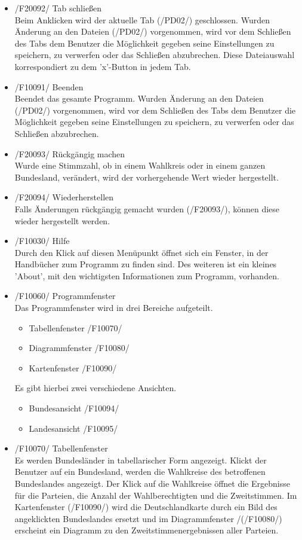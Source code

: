 \documentclass[10pt,a4paper]{article}
\begin{document}
\begin{itemize}
	\item /F20092/ Tab schließen \hfill \\
	Beim Anklicken wird der aktuelle Tab (/PD02/) geschlossen. Wurden Änderung an den Dateien (/PD02/) vorgenommen, wird vor dem Schließen des Tabs dem Benutzer die Möglichkeit gegeben seine Einstellungen zu speichern, zu verwerfen oder das Schließen abzubrechen. Diese Dateiauswahl korrespondiert zu dem 'x'-Button in jedem Tab.
	\item /F10091/ Beenden \hfill \\
	Beendet das gesamte Programm. Wurden Änderung an den Dateien (/PD02/) vorgenommen, wird vor dem Schließen des Tabs dem Benutzer die Möglichkeit gegeben seine Einstellungen zu speichern, zu verwerfen 
	oder das Schließen abzubrechen.
	\item /F20093/ Rückgängig machen \hfill \\
	Wurde eine Stimmzahl, ob in einem Wahlkreis oder in einem ganzen Bundesland, verändert, wird der vorhergehende Wert wieder hergestellt.
	\item /F20094/ Wiederherstellen \hfill \\
	Falls Änderungen rückgängig gemacht wurden (/F20093/), können diese wieder hergestellt werden.
	\item /F10030/ Hilfe \hfill \\
	Durch den Klick auf diesen Menüpunkt öffnet sich ein Fenster, in der Handbücher zum Programm zu finden sind. Des weiteren ist ein kleines 'About', mit den wichtigsten Informationen zum Programm, vorhanden.
	\item /F10060/ Programmfenster \hfill \\
	Das Programmfenster wird in drei Bereiche aufgeteilt.
	\begin{itemize}
		\item Tabellenfenster /F10070/
		\item Diagrammfenster /F10080/
		\item Kartenfenster /F10090/
	\end{itemize}
	Es gibt hierbei zwei verschiedene Ansichten.
	\begin{itemize}
		\item Bundesansicht /F10094/
		\item Landesansicht /F10095/
	\end{itemize}
	\item /F10070/ Tabellenfenster \hfill \\
	Es werden Bundesländer in tabellarischer Form angezeigt. Klickt der Benutzer auf ein Bundesland, werden die Wahlkreise des betroffenen Bundeslandes angezeigt. Der Klick auf die Wahlkreise öffnet die Ergebnisse für die Parteien, die Anzahl der Wahlberechtigten und die Zweitstimmen. Im Kartenfenster (/F10090/) wird die Deutschlandkarte durch ein Bild des angeklickten Bundeslandes ersetzt und im Diagrammfenster /(/F10080/) erscheint ein Diagramm zu den Zweitstimmenergebnissen aller Parteien. \\

\end{itemize}
\end{document}
